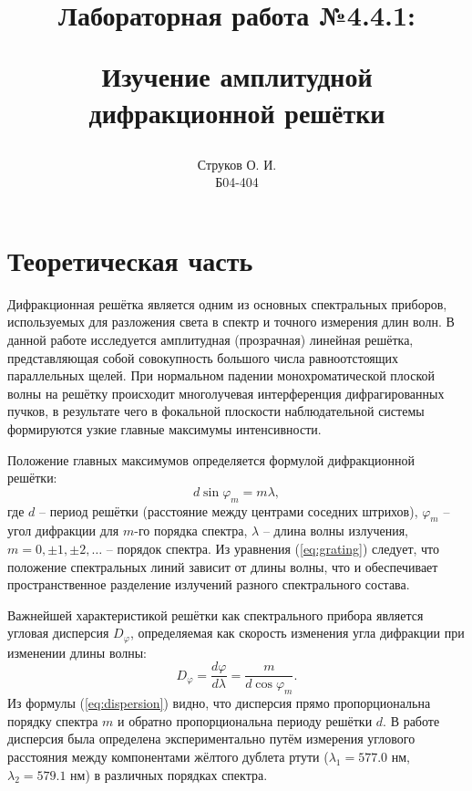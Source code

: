 \documentclass[12pt,a4paper]{article}
\begin{document}

\title{\begin{center}Лабораторная работа №4.4.1:\end{center}
Изучение амплитудной дифракционной решётки}
\author{Струков О. И. \\ Б04-404}
\date{}

\thispagestyle{empty}
\maketitle
\newpage
{}

\section*{Теоретическая часть}
Дифракционная решётка является одним из основных спектральных приборов, используемых для разложения света в спектр и точного измерения длин волн. В данной работе исследуется амплитудная (прозрачная) линейная решётка, представляющая собой совокупность большого числа равноотстоящих параллельных щелей. При нормальном падении монохроматической плоской волны на решётку происходит многолучевая интерференция дифрагированных пучков, в результате чего в фокальной плоскости наблюдательной системы формируются узкие главные максимумы интенсивности.

Положение главных максимумов определяется формулой дифракционной решётки:
\begin{equation}
    d \sin \varphi_m = m \lambda,
    \label{eq:grating}
\end{equation}
где $d$ -- период решётки (расстояние между центрами соседних штрихов), $\varphi_m$ -- угол дифракции для $m$-го порядка спектра, $\lambda$ -- длина волны излучения, $m = 0, \pm 1, \pm 2, \dots$ -- порядок спектра. Из уравнения (\ref{eq:grating}) следует, что положение спектральных линий зависит от длины волны, что и обеспечивает пространственное разделение излучений разного спектрального состава.

Важнейшей характеристикой решётки как спектрального прибора является угловая дисперсия $D_\varphi$, определяемая как скорость изменения угла дифракции при изменении длины волны:
\begin{equation}
    D_\varphi = \frac{d\varphi}{d\lambda} = \frac{m}{d \cos \varphi_m}.
    \label{eq:dispersion}
\end{equation}
Из формулы (\ref{eq:dispersion}) видно, что дисперсия прямо пропорциональна порядку спектра $m$ и обратно пропорциональна периоду решётки $d$. В работе дисперсия была определена экспериментально путём измерения углового расстояния между компонентами жёлтого дублета ртути ($\lambda_1 = 577.0$ нм, $\lambda_2 = 579.1$ нм) в различных порядках спектра.
\end{document}
